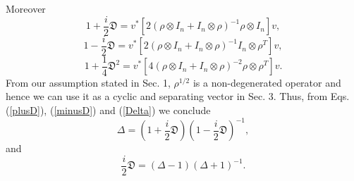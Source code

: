  Moreover
	\begin{equation} \label{plusD} 
    1+\frac{i}{2}\mathfrak{D}=v^\ast [ 2(\rho\otimes I_n+I_n\otimes \rho)^{-1}  \rho \otimes I_n]v,
    \end{equation}
    \begin{equation}\label{minusD}
    1-\frac{i}{2}\mathfrak{D}=v^\ast [ 2(\rho\otimes I_n+I_n\otimes \rho)^{-1}I_n \otimes \rho^T]v,
    \end{equation}
    \begin{equation}
    1+\frac{1}{4}\mathfrak{D}^2=v^\ast[ 4(\rho\otimes I_n+I_n\otimes \rho)^{-2}\rho \otimes \rho^T]v.
	\end{equation}
From our assumption stated in Sec. 1,
$\rho^{1/2}$ is a non-degenerated operator and hence we can use it as a 
cyclic and separating vector in Sec. 3.
Thus, from Eqs. (\ref{plusD}), (\ref{minusD}) and (\ref{Delta})  we conclude
		$$
    \Delta=\left(1+\frac{i}{2}\mathfrak{D}\right)\left(1-\frac{i}{2}\mathfrak{D}\right)^{-1},
		$$
		and
		$$
     \frac{i}{2}\mathfrak{D}=(\Delta-1)(\Delta+1)^{-1}.
		$$


